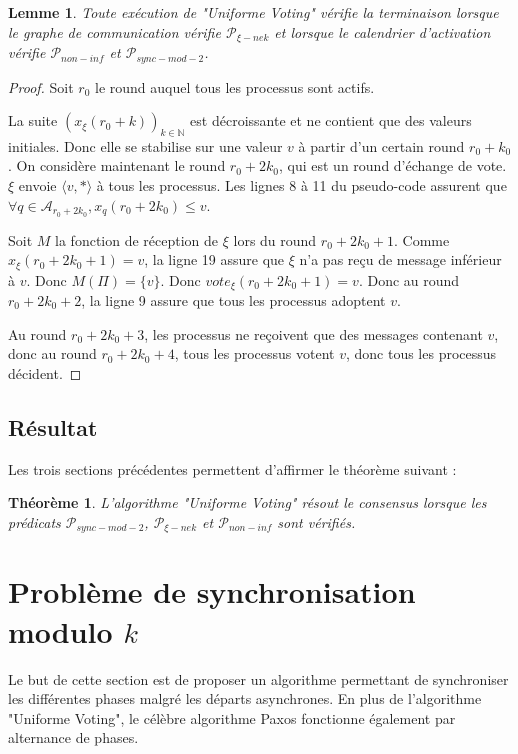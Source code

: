 \documentclass{article}
\newtheorem{lemma}{Lemme}[section]
\newtheorem{theorem}{Théorème}
\begin{document}
	\begin{lemma}
		Toute exécution de "Uniforme Voting" vérifie la terminaison lorsque le graphe de communication vérifie $\mathcal{P}_{\xi-nek}$
		et lorsque le calendrier d'activation vérifie $\mathcal{P}_{non-inf}$ et $\mathcal{P}_{sync-mod-2}$.
	\end{lemma}
	\begin{proof}
		Soit $r_0$ le round auquel tous les processus sont actifs.

		La suite $(x_\xi(r_0+k))_{k \in \mathds{N}}$ est décroissante et ne contient que des valeurs initiales. Donc elle se stabilise sur une valeur $v$ à partir d'un certain round $r_0+k_0$.
		On considère maintenant le round $r_0+2k_0$, qui est un round d'échange de vote.
		$\xi$ envoie $\langle v, * \rangle$ à tous les processus. Les lignes 8 à 11 du pseudo-code assurent que $\forall q \in \mathcal{A}_{r_0+2k_0}, x_q(r_0+2k_0) \leq v$.

		Soit $M$ la fonction de réception de $\xi$ lors du round $r_0+2k_0+1$.
		Comme $x_\xi(r_0+2k_0+1) = v$, la ligne 19 assure que $\xi$ n'a pas reçu de message inférieur à $v$.
		Donc $M(\Pi) = \{v\}$. Donc $vote_\xi(r_0+2k_0+1) = v$. Donc au round $r_0+2k_0+2$, la ligne 9 assure que tous les processus adoptent $v$.

		Au round $r_0+2k_0+3$, les processus ne reçoivent que des messages contenant $v$, donc au round $r_0+2k_0+4$, tous les processus votent $v$, donc tous les processus décident.
	\end{proof}
\subsection{Résultat}

Les trois sections précédentes permettent d'affirmer le théorème suivant :

\begin{theorem}
	L'algorithme "Uniforme Voting" résout le consensus lorsque les prédicats $\mathcal{P}_{sync-mod-2}$, $\mathcal{P}_{\xi-nek}$ et $\mathcal{P}_{non-inf}$ sont vérifiés.
\end{theorem}

\section{Problème de synchronisation modulo $k$}

Le but de cette section est de proposer un algorithme permettant de synchroniser les différentes phases malgré les départs asynchrones.
En plus de l'algorithme "Uniforme Voting", le célèbre algorithme Paxos \cite{paxos} fonctionne également par alternance de phases.
\end{document}
